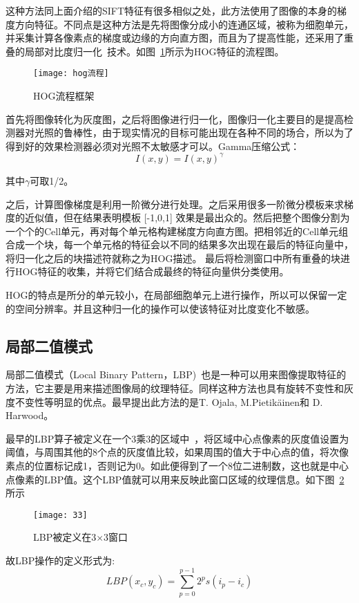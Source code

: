  这种方法同上面介绍的SIFT特征有很多相似之处，此方法使用了图像的本身的梯度方向特征。不同点是这种方法是先将图像分成小的连通区域，被称为细胞单元，并采集计算各像素点的梯度或边缘的方向直方图，而且为了提高性能，还采用了重叠的局部对比度归一化~\cite{krizhevsky2012imagenet}技术。如图~\ref{fig:hogliucheng}所示为HOG特征的流程图。
\begin{figure}[H] %
  \centering
  \texttt{[image: hog流程]}
  \caption{HOG流程框架}
  \label{fig:hogliucheng}
\end{figure}

首先将图像转化为灰度图，之后将图像进行归一化，图像归一化主要目的是提高检测器对光照的鲁棒性，由于现实情况的目标可能出现在各种不同的场合，所以为了得到好的效果检测器必须对光照不太敏感才可以。Gamma压缩公式：
\begin{equation}
 I(x,y) = I(x,y)^{\gamma}
\end{equation}

其中$\gamma$可取1/2。

之后，计算图像梯度是利用一阶微分进行处理。之后采用很多一阶微分模板来求梯度的近似值，但在结果表明模板 [-1,0,1] 效果是最出众的。然后把整个图像分割为一个个的Cell单元，再对每个单元格构建梯度方向直方图。把相邻近的Cell单元组合成一个块，每一个单元格的特征会以不同的结果多次出现在最后的特征向量中，将归一化之后的块描述符就称之为HOG描述。
最后将检测窗口中所有重叠的块进行HOG特征的收集，并将它们结合成最终的特征向量供分类使用。

HOG的特点是所分的单元较小，在局部细胞单元上进行操作，所以可以保留一定的空间分辨率。并且这种归一化的操作可以使该特征对比度变化不敏感。
\subsection{局部二值模式}
\label{sec:lbp}
局部二值模式（Local Binary Pattern，LBP)~\cite{ojala1994performance}也是一种可以用来图像提取特征的方法，它主要是用来描述图像局的纹理特征。同样这种方法也具有旋转不变性和灰度不变性等明显的优点。最早提出此方法的是T. Ojala, M.Pietikäinen和 D. Harwood。

最早的LBP算子被定义在一个3乘3的区域中~\cite{wang1990texture}，将区域中心点像素的灰度值设置为阈值，与周围其他的8个点的灰度值比较，如果周围的值大于中心点的值，将次像素点的位置标记成1，否则记为0。如此便得到了一个8位二进制数，这也就是中心点像素的LBP值。这个LBP值就可以用来反映此窗口区域的纹理信息。如下图~\ref{fig:lbpchuangkou}所示
\begin{figure}[H] %
  \centering
  \texttt{[image: 33]}
  \caption{LBP被定义在3$\times$3窗口}
  \label{fig:lbpchuangkou}
\end{figure}
故LBP操作的定义形式为:
\begin{equation}
LBP(x_c,y_c) = \sum_{p=0}^{p-1}2^{p}s(i_p-i_c)
\end{equation}

